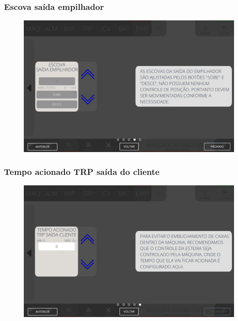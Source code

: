 \newpage
\thispagestyle{fancy}
\vspace*{40 pt}
\subsubsection{\small{Escova saída empilhador}} \label{sec:telaAjustesEmpilhadorEscovaSaidaEmpilhador}
\vspace*{\fill}
\begin{figure}[h]
    \centering
    \includegraphics[width=576 px,height=360 px]{src/imagesICV/08-stacker/settings/16.png}
\end{figure}
\vspace*{\fill}

\newpage
\thispagestyle{fancy}
\vspace*{40 pt}
\subsubsection{\small{Tempo acionado TRP saída do cliente}} \label{sec:telaAjustesEmpilhadorTempoAcionadoTRPSaidaCliente}
\vspace*{\fill}
\begin{figure}[h]
    \centering
    \includegraphics[width=576 px,height=360 px]{src/imagesICV/08-stacker/settings/17.png}
\end{figure}
\vspace*{\fill}
